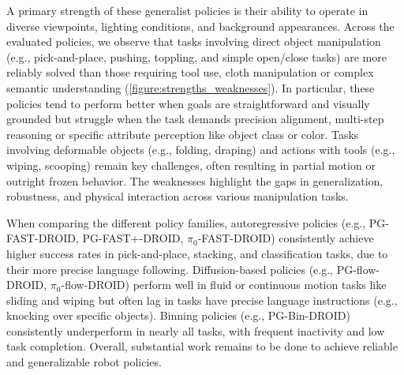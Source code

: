A primary strength of these generalist policies is their ability to operate in diverse viewpoints, lighting conditions, and background appearances. Across the evaluated policies, we observe that tasks involving direct object manipulation (e.g., pick-and-place, pushing, toppling, and simple open/close tasks) are more reliably solved than those requiring tool use, cloth manipulation or complex semantic understanding (\cref{figure:strengths_weaknesses}). In particular, these policies tend to perform better when goals are straightforward and visually grounded but struggle when the task demands precision alignment, multi-step reasoning or specific attribute perception like object class or color. Tasks involving deformable objects (e.g., folding, draping) and actions with tools (e.g., wiping, scooping) remain key challenges, often resulting in partial motion or outright frozen behavior. The weaknesses highlight the gaps in generalization, robustness, and physical interaction across various manipulation tasks.

When comparing the different policy families, autoregressive policies (e.g., PG-FAST-DROID, PG-FAST+-DROID, $\pi_0$-FAST-DROID) consistently achieve higher success rates in pick-and-place, stacking, and classification tasks, due to their more precise language following. Diffusion-based policies (e.g., PG-flow-DROID, $\pi_0$-flow-DROID) perform well in fluid or continuous motion tasks like sliding and wiping but often lag in tasks have precise language instructions (e.g., knocking over specific objects). Binning policies (e.g., PG-Bin-DROID) consistently underperform in nearly all tasks, with frequent inactivity and low task completion. Overall, substantial work remains to be done to achieve reliable and generalizable robot policies.




